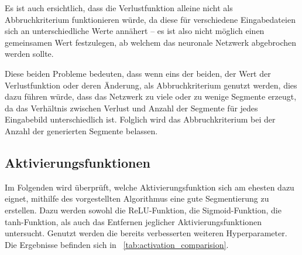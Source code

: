 Es ist auch ersichtlich, dass die Verlustfunktion alleine nicht als Abbruchkriterium funktionieren würde, da diese für verschiedene Eingabedateien sich an unterschiedliche Werte annähert -- es ist also nicht möglich einen gemeinsamen Wert festzulegen, ab welchem das neuronale Netzwerk abgebrochen werden sollte.

Diese beiden Probleme bedeuten, dass wenn eins der beiden, der Wert der Verlustfunktion oder deren Änderung, als Abbruchkriterium genutzt werden, dies dazu führen würde, dass das Netzwerk zu viele oder zu wenige Segmente erzeugt, da das Verhältnis zwischen Verlust und Anzahl der Segmente für jedes Eingabebild unterschiedlich ist. Folglich wird das Abbruchkriterium bei der Anzahl der generierten Segmente belassen.

\subsection{Aktivierungsfunktionen}
\label{ssec:exp_architecture_activation}

Im Folgenden wird überprüft, welche Aktivierungsfunktion sich am ehesten dazu eignet, mithilfe des vorgestellten Algorithmus eine gute Segmentierung zu erstellen. Dazu werden sowohl die ReLU-Funktion, die Sigmoid-Funktion, die tanh-Funktion, als auch das Entfernen jeglicher Aktivierungsfunktionen untersucht. Genutzt werden die bereits verbesserten weiteren Hyperparameter. Die Ergebnisse befinden sich in \tablename~\ref{tab:activation_comparision}.

